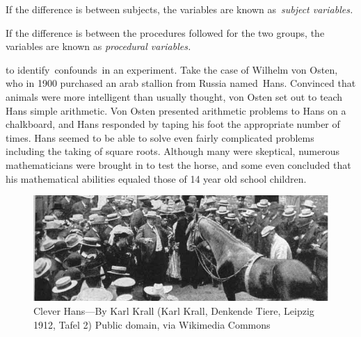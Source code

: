 \begin{refsection}
If the difference is between subjects, the variables are known as \emph{subject variables.}

If the difference is between the procedures followed for the two groups, the variables are known as \emph{procedural variables.}

 to identify confounds in an experiment. Take the case of Wilhelm von Osten, who in 1900 purchased an arab stallion from Russia named Hans. Convinced that animals were more intelligent than usually thought, von Osten set out to teach Hans simple arithmetic. Von Osten presented arithmetic problems to Hans on a chalkboard, and Hans responded by taping his foot the appropriate number of times. Hans seemed to be able to solve even fairly complicated problems including the taking of square roots. Although many were skeptical, numerous mathematicians were brought in to test the horse, and some even concluded that his mathematical abilities equaled those of 14 year old school children.

\begin{figure}\includegraphics{../images/CleverHans.jpg}\caption{Clever Hans---By Karl Krall (Karl Krall, Denkende Tiere, Leipzig 1912, Tafel 2) Public domain, via Wikimedia Commons}\label{fig:cleverhans}\end{figure}


\end{refsection}
